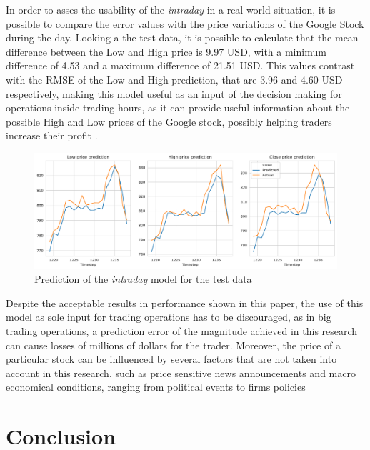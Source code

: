 \documentclass[10pt,twocolumn,letterpaper]{article}
\begin{document}
In order to asses the usability of the \textit{intraday} in a real world situation, it is possible to compare the error values with the price variations of the Google Stock during the day. Looking a the test data, it is possible to calculate that the mean difference between the Low and High price is 9.97 USD, with a minimum difference of 4.53 and a maximum difference of 21.51 USD. This values contrast with the RMSE of the Low and High prediction, that are 3.96 and 4.60 USD respectively, making this model useful as an input of the decision making for operations inside trading hours, as it can provide useful information about the possible High and Low prices of the Google stock, possibly helping traders increase their profit \cite{Naik2020}.


\begin{figure}[h]
	\begin{center}
		\includegraphics[width=0.9\linewidth]{prediction_intraday.pdf}
		\caption{Prediction of the \textit{intraday} model for the test data}
		\label{fig:intraday_pred}
	\end{center}
\end{figure}

Despite the acceptable results in performance shown in this paper, the use of this model as sole input for trading operations has to be discouraged, as in big trading operations, a prediction error of the magnitude achieved in this research can cause losses of millions of dollars for the trader. Moreover, the price of a particular stock can be influenced by several factors that are not taken into account in this research, such as price sensitive news announcements \cite{Mazouz2015} and macro economical conditions, ranging from political events to firms policies \cite{Tan2007}

\section{Conclusion}
\end{document}

